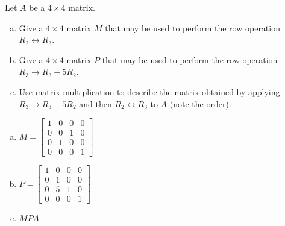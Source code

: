 
\begin{exerciseStatement}


Let \(A\) be a \(4 \times 4\) matrix.


\begin{enumerate}[(a)]
\item Give a \(4 \times 4\) matrix \(M\) that may be used to perform the row operation \( R_2 \leftrightarrow R_3 \).
\item Give a \(4 \times 4\) matrix \(P\) that may be used to perform the row operation \( R_3 \to R_3 + 5R_2 \).
\item Use matrix multiplication to describe the matrix obtained by applying \( R_3 \to R_3 + 5R_2 \) and then \( R_2 \leftrightarrow R_3 \) to \(A\) (note the order). 
\end{enumerate}
    
\end{exerciseStatement}
    
\begin{exerciseAnswer} 

\begin{enumerate}[(a)]
\item \(M= \left[\begin{array}{cccc}
1 & 0 & 0 & 0 \\
0 & 0 & 1 & 0 \\
0 & 1 & 0 & 0 \\
0 & 0 & 0 & 1
\end{array}\right] \)
\item \(P= \left[\begin{array}{cccc}
1 & 0 & 0 & 0 \\
0 & 1 & 0 & 0 \\
0 & 5 & 1 & 0 \\
0 & 0 & 0 & 1
\end{array}\right] \)
\item \(MPA\)
\end{enumerate}
    
\end{exerciseAnswer}
    
